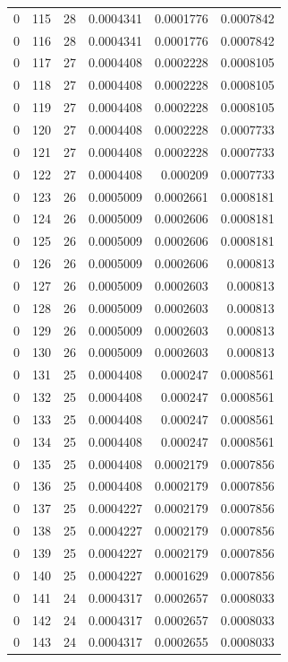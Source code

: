 \begin{tabular}{rrrrrr}
0 & 115 & 28 & 0.0004341 & 0.0001776 & 0.0007842 \\
0 & 116 & 28 & 0.0004341 & 0.0001776 & 0.0007842 \\
0 & 117 & 27 & 0.0004408 & 0.0002228 & 0.0008105 \\
0 & 118 & 27 & 0.0004408 & 0.0002228 & 0.0008105 \\
0 & 119 & 27 & 0.0004408 & 0.0002228 & 0.0008105 \\
0 & 120 & 27 & 0.0004408 & 0.0002228 & 0.0007733 \\
0 & 121 & 27 & 0.0004408 & 0.0002228 & 0.0007733 \\
0 & 122 & 27 & 0.0004408 & 0.000209 & 0.0007733 \\
0 & 123 & 26 & 0.0005009 & 0.0002661 & 0.0008181 \\
0 & 124 & 26 & 0.0005009 & 0.0002606 & 0.0008181 \\
0 & 125 & 26 & 0.0005009 & 0.0002606 & 0.0008181 \\
0 & 126 & 26 & 0.0005009 & 0.0002606 & 0.000813 \\
0 & 127 & 26 & 0.0005009 & 0.0002603 & 0.000813 \\
0 & 128 & 26 & 0.0005009 & 0.0002603 & 0.000813 \\
0 & 129 & 26 & 0.0005009 & 0.0002603 & 0.000813 \\
0 & 130 & 26 & 0.0005009 & 0.0002603 & 0.000813 \\
0 & 131 & 25 & 0.0004408 & 0.000247 & 0.0008561 \\
0 & 132 & 25 & 0.0004408 & 0.000247 & 0.0008561 \\
0 & 133 & 25 & 0.0004408 & 0.000247 & 0.0008561 \\
0 & 134 & 25 & 0.0004408 & 0.000247 & 0.0008561 \\
0 & 135 & 25 & 0.0004408 & 0.0002179 & 0.0007856 \\
0 & 136 & 25 & 0.0004408 & 0.0002179 & 0.0007856 \\
0 & 137 & 25 & 0.0004227 & 0.0002179 & 0.0007856 \\
0 & 138 & 25 & 0.0004227 & 0.0002179 & 0.0007856 \\
0 & 139 & 25 & 0.0004227 & 0.0002179 & 0.0007856 \\
0 & 140 & 25 & 0.0004227 & 0.0001629 & 0.0007856 \\
0 & 141 & 24 & 0.0004317 & 0.0002657 & 0.0008033 \\
0 & 142 & 24 & 0.0004317 & 0.0002657 & 0.0008033 \\
0 & 143 & 24 & 0.0004317 & 0.0002655 & 0.0008033 \\

\end{tabular}
